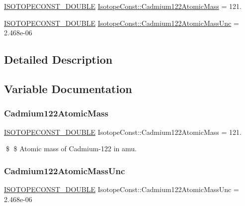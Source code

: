 \begin{DoxyCompactItemize}
\item 
\mbox{\hyperlink{group___isotope_const-_macros_ga8f45a7272ce02c0b4c65c44636ed719a}{I\+S\+O\+T\+O\+P\+E\+C\+O\+N\+S\+T\+\_\+\+D\+O\+U\+B\+LE}} \mbox{\hyperlink{group___isotope_const-_cadmium-_cd122_gac3d144dff72d68b5c7d0b161be17c97f}{Isotope\+Const\+::\+Cadmium122\+Atomic\+Mass}} = 121.
\item 
\mbox{\hyperlink{group___isotope_const-_macros_ga8f45a7272ce02c0b4c65c44636ed719a}{I\+S\+O\+T\+O\+P\+E\+C\+O\+N\+S\+T\+\_\+\+D\+O\+U\+B\+LE}} \mbox{\hyperlink{group___isotope_const-_cadmium-_cd122_ga3392e3b62e0f1fa2ad6fa3ac35f39d07}{Isotope\+Const\+::\+Cadmium122\+Atomic\+Mass\+Unc}} = 2.\+468e-\/06
\end{DoxyCompactItemize}


\subsection{Detailed Description}


\subsection{Variable Documentation}
\mbox{\label{group___isotope_const-_cadmium-_cd122_gac3d144dff72d68b5c7d0b161be17c97f}} 
\subsubsection{\texorpdfstring{Cadmium122\+Atomic\+Mass}{Cadmium122AtomicMass}}
{\footnotesize\ttfamily \mbox{\hyperlink{group___isotope_const-_macros_ga8f45a7272ce02c0b4c65c44636ed719a}{I\+S\+O\+T\+O\+P\+E\+C\+O\+N\+S\+T\+\_\+\+D\+O\+U\+B\+LE}} Isotope\+Const\+::\+Cadmium122\+Atomic\+Mass = 121.}

\$ \$ Atomic mass of Cadmium-\/122 in amu. \mbox{\label{group___isotope_const-_cadmium-_cd122_ga3392e3b62e0f1fa2ad6fa3ac35f39d07}} 
\subsubsection{\texorpdfstring{Cadmium122\+Atomic\+Mass\+Unc}{Cadmium122AtomicMassUnc}}
{\footnotesize\ttfamily \mbox{\hyperlink{group___isotope_const-_macros_ga8f45a7272ce02c0b4c65c44636ed719a}{I\+S\+O\+T\+O\+P\+E\+C\+O\+N\+S\+T\+\_\+\+D\+O\+U\+B\+LE}} Isotope\+Const\+::\+Cadmium122\+Atomic\+Mass\+Unc = 2.\+468e-\/06}

